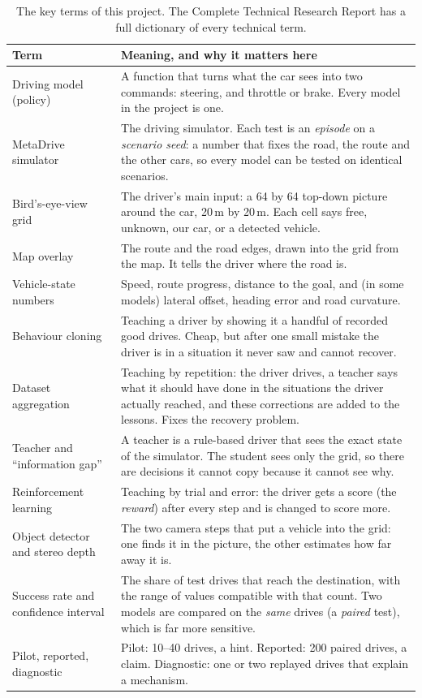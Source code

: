 \begin{table}[H]\centering\small
\caption{The key terms of this project. The Complete Technical Research Report has a full dictionary of every technical term.}\label{tab:g-terms}
\begin{tabularx}{\textwidth}{@{}>{\raggedright\arraybackslash}p{4.0cm}X@{}}\toprule
Term & Meaning, and why it matters here\\\midrule
Driving model (policy) & A function that turns what the car sees into two commands: steering, and throttle or brake. Every model in the project is one.\\
MetaDrive simulator & The driving simulator. Each test is an \emph{episode} on a \emph{scenario seed}: a number that fixes the road, the route and the other cars, so every model can be tested on identical scenarios.\\
Bird's-eye-view grid & The driver's main input: a 64 by 64 top-down picture around the car, 20\,m by 20\,m. Each cell says free, unknown, our car, or a detected vehicle.\\
Map overlay & The route and the road edges, drawn into the grid from the map. It tells the driver where the road is.\\
Vehicle-state numbers & Speed, route progress, distance to the goal, and (in some models) lateral offset, heading error and road curvature.\\
Behaviour cloning & Teaching a driver by showing it a handful of recorded good drives. Cheap, but after one small mistake the driver is in a situation it never saw and cannot recover.\\
Dataset aggregation & Teaching by repetition: the driver drives, a teacher says what it should have done in the situations the driver actually reached, and these corrections are added to the lessons. Fixes the recovery problem.\\
Teacher and ``information gap'' & A teacher is a rule-based driver that sees the exact state of the simulator. The student sees only the grid, so there are decisions it cannot copy because it cannot see why.\\
Reinforcement learning & Teaching by trial and error: the driver gets a score (the \emph{reward}) after every step and is changed to score more.\\
Object detector and stereo depth & The two camera steps that put a vehicle into the grid: one finds it in the picture, the other estimates how far away it is.\\
Success rate and confidence interval & The share of test drives that reach the destination, with the range of values compatible with that count. Two models are compared on the \emph{same} drives (a \emph{paired} test), which is far more sensitive.\\
Pilot, reported, diagnostic & Pilot: 10--40 drives, a hint. Reported: 200 paired drives, a claim. Diagnostic: one or two replayed drives that explain a mechanism.\\\bottomrule
\end{tabularx}
\end{table}

